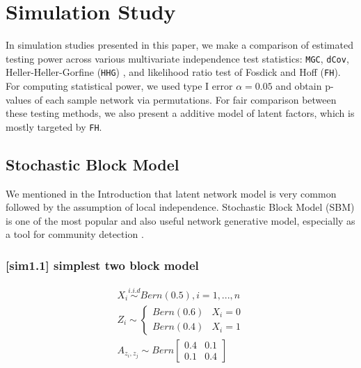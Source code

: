 \documentclass[12pt]{article}
\theoremstyle{definition}
\begin{document}
\section{Simulation Study}
\label{sec:sim}
	
In simulation studies presented in this paper, we make a comparison of estimated testing power across various multivariate independence test statistics: \texttt{MGC}, \texttt{dCov}, Heller-Heller-Gorfine (\texttt{HHG}) \citep{heller2012consistent}, and likelihood ratio test of Fosdick and Hoff (\texttt{FH}). For computing statistical power, we used type I error $\alpha = 0.05$ and obtain p-values of each sample network via permutations. For fair comparison between these testing methods, we also present a additive model of latent factors, which is mostly targeted by \texttt{FH}.   
	
\subsection{Stochastic Block Model}

We mentioned in the Introduction that latent network model is very common followed by the assumption of local independence. Stochastic Block Model (SBM) is one of the most popular and also useful network generative model, especially as a tool for community detection \citep{karrer2011stochastic}. 
	
\subsubsection{[sim1.1] simplest two block model}
	
\begin{equation}
\label{eq:twoSBM}
\begin{gathered}
	X_{i} \overset{i.i.d}{\sim} Bern(0.5), i = 1,... , n \\ 
	Z_{i}  \sim  \left\{  \begin{array}{cc} Bern(0.6) & X_{i} = 0 \\ Bern(0.4) & X_{i} = 1  \end{array} \right. \\
	A_{z_{i}, z_{j}} \sim Bern \left[  \begin{array}{cc}   0.4 & 0.1  \\ 0.1 & 0.4 \end{array}  \right]
	\end{gathered}
\end{equation}
	
\end{document}
